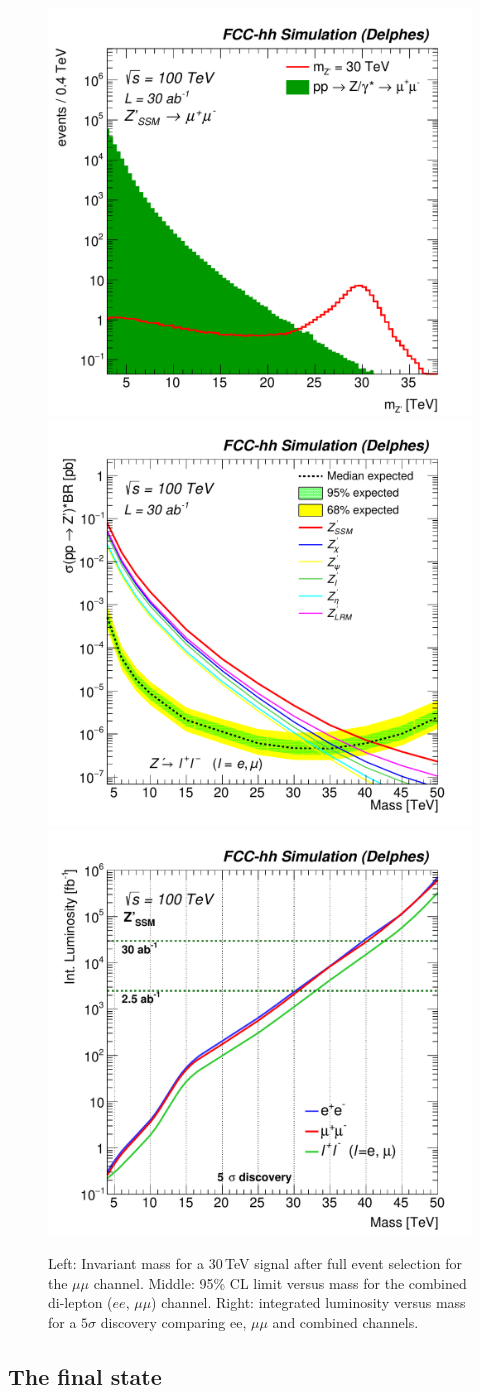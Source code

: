 \begin{figure}[!htb]
  \centering
  \includegraphics[width=0.32\columnwidth]{Fig/mzp_sel0_nostack_log_mm-eps-converted-to.pdf}
  \includegraphics[width=0.32\columnwidth]{Fig/lim_Zprime_ll_fcc_v02_allxs-eps-converted-to.pdf}
  \includegraphics[width=0.32\columnwidth]{Fig/DiscoveryPotential_ll_comb_rootStyle-eps-converted-to.pdf}
  \caption{Left: Invariant mass for a 30\,TeV signal after full event selection for the $\mu\mu$ channel. Middle: 95\% CL limit versus mass for the combined di-lepton ($ee$, $\mu\mu$) channel. Right: integrated luminosity versus mass for a $5\sigma$ discovery comparing ee, $\mu\mu$ and combined channels.}
  \label{figure:leptonicresonances:ll}
\end{figure}



\subsection{The \texorpdfstring{\tautau}{tautau} final state}
\label{sec:leptautau}

